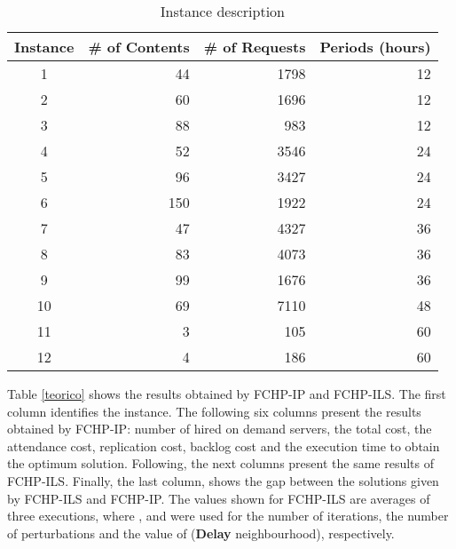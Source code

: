 \begin{table}[htp]
\small
\setlength{\tabcolsep}{3mm}
\caption{Instance description}
\begin{center}
\setlength{\tabcolsep}{0.6mm}
\begin{tabular}{|c|r|r|r|}
\hline 
Instance & \# of Contents  & \# of Requests & Periods (hours) \\
\hline
1	&	44	&	1798		&	12		\\
2	&	60	&	1696		&	12	    \\
3	&	88	&	983	    	&	12		\\
4	&	52	&	3546		&	24		\\
5	&	96	&	3427		&	24		\\
6	&	150	&	1922		&	24		\\
7   &   47  &   4327	    &   36      \\
8   &   83  &   4073        &   36      \\
9   &   99  &   1676        &   36      \\
10   &  69  &   7110 		&   48      \\
11   &   3  &   105         &   60      \\
12   &   4  &   186         &   60      \\
\hline
\end{tabular}
\end{center}
\label{Instance}
\end{table}
	
Table \ref{teorico} shows the results obtained by FCHP-IP and FCHP-ILS. The first column identifies the instance. The following six columns present the results obtained by FCHP-IP: number of hired  on demand servers, the total cost, the attendance cost, replication cost, backlog cost and the execution time to obtain the optimum solution. Following, the next columns present the same results of FCHP-ILS. Finally, the last column, shows the gap between the solutions given by FCHP-ILS and FCHP-IP. The  values shown for FCHP-ILS are averages of three executions, where  ,  and  were used for the number of iterations, the number of perturbations and the value of  ({\bf Delay} neighbourhood), respectively. 


